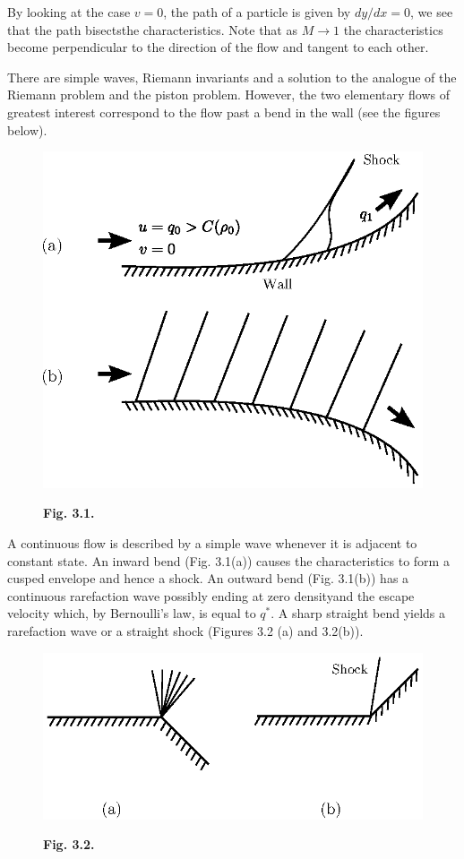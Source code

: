 By looking at the case $v=0$, the path of a particle is given by $dy/dx =0$, we see that the path bisects\pageoriginale the characteristics. Note that as $M \to 1$ the characteristics become perpendicular to the direction of the flow and tangent to each other.

There are simple waves, Riemann invariants and a solution to the analogue of the Riemann problem and the piston problem. However, the two elementary flows of greatest  interest correspond to the flow past a bend in the wall (see the figures below).
\begin{figure}[H]
\centering
\includegraphics{figures/fig3.1.eps}
\centerline{\bf Fig. 3.1.}
\end{figure}

A continuous flow is described by a simple wave whenever it is adjacent to constant state. An inward bend (Fig. 3.1(a)) causes the characteristics to form a cusped envelope and hence a shock. An outward bend (Fig. 3.1(b)) has a continuous rarefaction wave possibly ending at zero density\pageoriginale and the escape velocity which, by Bernoulli's law, is equal to $q^*$. A sharp straight bend yields a rarefaction wave or a straight shock (Figures 3.2 (a) and 3.2(b)).
\begin{figure}[H]
\centering
\includegraphics{figures/fig3.2.eps}
\centerline{\bf Fig. 3.2.}
\end{figure}

